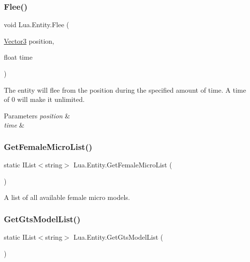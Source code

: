 \subsubsection{\texorpdfstring{Flee()}{Flee()}\hspace{0.1cm}{\footnotesize\ttfamily [2/2]}}
{\footnotesize\ttfamily void Lua.\+Entity.\+Flee (\begin{DoxyParamCaption}\item[{\mbox{\hyperlink{class_lua_1_1_vector3}{Vector3}}}]{position,  }\item[{float}]{time }\end{DoxyParamCaption})}



The entity will flee from the position during the specified amount of time. A time of 0 will make it unlimited. 


\begin{DoxyParams}{Parameters}
{\em position} & \\
\hline
{\em time} & \\
\hline
\end{DoxyParams}
\mbox{\label{class_lua_1_1_entity_a42f84cbad068689f4308f5e4b1c7a981}} 
\subsubsection{\texorpdfstring{GetFemaleMicroList()}{GetFemaleMicroList()}}
{\footnotesize\ttfamily static I\+List$<$string$>$ Lua.\+Entity.\+Get\+Female\+Micro\+List (\begin{DoxyParamCaption}{ }\end{DoxyParamCaption})\hspace{0.3cm}{\ttfamily [static]}}



A list of all available female micro models. 

\mbox{\label{class_lua_1_1_entity_a8abff3f32d1cbaa6355d4d217ab558e1}} 
\subsubsection{\texorpdfstring{GetGtsModelList()}{GetGtsModelList()}}
{\footnotesize\ttfamily static I\+List$<$string$>$ Lua.\+Entity.\+Get\+Gts\+Model\+List (\begin{DoxyParamCaption}{ }\end{DoxyParamCaption})\hspace{0.3cm}{\ttfamily [static]}}



